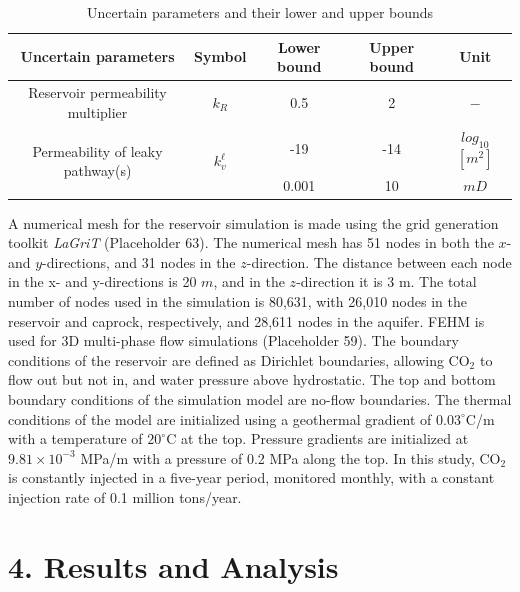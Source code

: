 \documentclass[10pt, twoside]{article}
\begin{document}
\begin{table}
\caption{Uncertain parameters and their lower and upper bounds}
\label{tbl:1}
\begin{center}
\begin{tabular}{ |c|c|c|c|c| } 
\hline
\textbf{Uncertain parameters} & \textbf{Symbol} & \textbf{Lower bound} & \textbf{Upper bound} & \textbf{Unit} \\
\hline \hline
Reservoir permeability multiplier & $k_R$ & 0.5 & 2 & $-$ \\ 
\multirow{2}{*}{Permeability of leaky pathway(s)} & \multirow{2}{*}{$k_v^\ell$} & -19 & -14 & $log_{10}$ $[m^2]$ \\ &  &  0.001 & 10 & $mD$ \\ 
\hline
\end{tabular}
\end{center}
\end{table}

A numerical mesh for the reservoir simulation is made using the grid generation toolkit \textit{LaGriT} (Placeholder 63). The numerical mesh has 51 nodes in both the $x$- and $y$-directions, and 31 nodes in the $z$-direction. The distance between each node in the x- and y-directions is 20 $m$, and in the $z$-direction it is 3 m. The total number of nodes used in the simulation is 80,631, with 26,010 nodes in the reservoir and caprock, respectively, and 28,611 nodes in the aquifer. FEHM is used for 3D multi-phase flow simulations (Placeholder 59). The boundary conditions of the reservoir are defined as Dirichlet boundaries, allowing CO$_2$ to flow out but not in, and water pressure above hydrostatic. The top and bottom boundary conditions of the simulation model are no-flow boundaries. The thermal conditions of the model are initialized using a geothermal gradient of $0.03^\circ$C/m with a temperature of $20^\circ$C at the top. Pressure gradients are initialized at $9.81\times10^{-3}$  MPa/m with a pressure of 0.2 MPa along the top. In this study, CO$_2$ is constantly injected in a five-year period, monitored monthly, with a constant injection rate of 0.1 million tons/year.

\section*{\textbf{4. Results and Analysis}}
\end{document}
